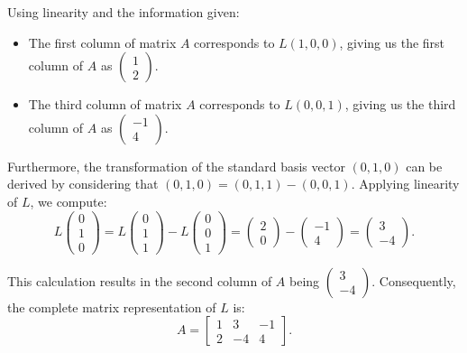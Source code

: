 \documentclass{report}
\begin{document}
Using linearity and the information given:
\begin{itemize}
    \item The first column of matrix $A$ corresponds to $L(1,0,0)$, giving us the first column of $A$ as $\left(\begin{array}{c} 1 \\ 2 \end{array}\right)$.
    \item The third column of matrix $A$ corresponds to $L(0,0,1)$, giving us the third column of $A$ as $\left(\begin{array}{r} -1 \\ 4 \end{array}\right)$.
\end{itemize}

Furthermore, the transformation of the standard basis vector $(0,1,0)$ can be derived by considering that $(0,1,0) = (0,1,1) - (0,0,1)$. Applying linearity of $L$, we compute:
\[
L \left(\begin{array}{c} 0 \\ 1\\ 0 \end{array}\right) = L\left(\begin{array}{c} 0 \\ 1\\ 1 \end{array}\right) - L\left(\begin{array}{r} 0 \\ 0 \\ 1 \end{array}\right) = \left(\begin{array}{c} 2 \\ 0 \end{array}\right) - \left(\begin{array}{r} -1 \\ 4 \end{array}\right) = \left(\begin{array}{r} 3 \\ -4 \end{array}\right).
\]

This calculation results in the second column of $A$ being $\left(\begin{array}{r} 3 \\ -4 \end{array}\right)$. Consequently, the complete matrix representation of $L$ is:
\[
A = \begin{bmatrix} 1 & 3 & -1 \\ 2 & -4 & 4 \end{bmatrix}.
\]
\end{document}
